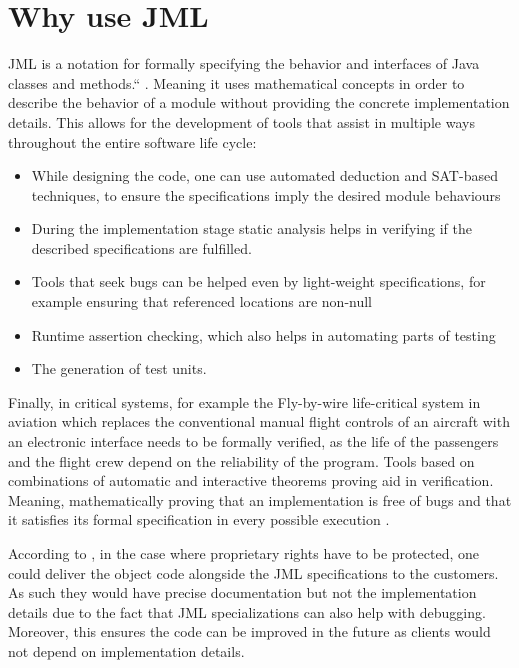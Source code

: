 \documentclass{article}
\begin{document}
\section{Why use JML}
JML is a notation for formally specifying the behavior and interfaces of Java classes and methods.“ \cite{leavens2008jml}. Meaning it uses mathematical concepts in order to describe the behavior of a module without providing the concrete implementation details. This allows for the development of tools that assist in multiple ways throughout the entire software life cycle:

\begin{itemize}
    \item While designing the code, one can use automated deduction and SAT-based techniques, to ensure the specifications imply the desired module behaviours\cite{jackson2019alloy}
    \item During the implementation stage static analysis helps in verifying if the described specifications are fulfilled.\cite{hatcliff2012behavioral}
    \item Tools that seek bugs can be helped even by light-weight specifications, for example ensuring that referenced locations are non-null \cite{hatcliff2012behavioral}
    \item Runtime assertion checking, which also helps in automating parts of testing\cite{boyapati2002korat}
    \item The generation of test units.
\end{itemize}

Finally, in critical systems, for example the Fly-by-wire life-critical system in aviation which replaces the conventional manual flight controls of an aircraft with an electronic interface \cite{sutherland1968fly} needs to be formally verified, as the life of the passengers and the flight crew depend on the reliability of the program. Tools based on combinations of automatic and interactive theorems proving aid in verification. Meaning, mathematically proving that an implementation is free of bugs and that it satisfies its formal specification in every possible execution .

According to \cite{boyapati2002korat}, in the case where proprietary rights have to be protected, one could deliver the object code alongside the JML specifications to the customers. As such they would have precise documentation but not the implementation details due to the fact that JML specializations can also help with debugging. Moreover, this ensures the code can be improved in the future as clients would not depend on implementation details. 
\end{document}
